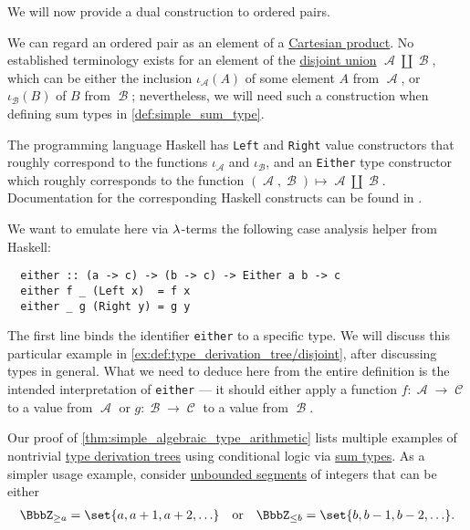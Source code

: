 \begin{example}
\begin{thmenum}
     We will now provide a dual construction to ordered pairs.

    We can regard an ordered pair as an element of a \hyperref[def:cartesian_product]{Cartesian product}. No established terminology exists for an element of the \hyperref[def:disjoint_union]{disjoint union} \( \mscrA \amalg \mscrB \), which can be either the inclusion \( \iota_\mscrA(A) \) of some element \( A \) from \( \mscrA \), or \( \iota_\mscrB(B) \) of \( B \) from \( \mscrB \); nevertheless, we will need such a construction when defining sum types in \cref{def:simple_sum_type}.

    The programming language Haskell has \verb|Left| and \verb|Right| value constructors that roughly correspond to the functions \( \iota_\mscrA \) and \( \iota_\mscrB \), and an \verb|Either| type constructor which roughly corresponds to the function \( (\mscrA, \mscrB) \mapsto \mscrA \amalg \mscrB \). Documentation for the corresponding Haskell constructs can be found in \cite{HackageDocs:base-4.21:either}.

    We want to emulate here via \( {\mathrm \lambda} \)-terms the following case analysis helper from Haskell:
    \begin{verbatim}
  either :: (a -> c) -> (b -> c) -> Either a b -> c
  either f _ (Left x)  = f x
  either _ g (Right y) = g y
    \end{verbatim}\vspace{-\baselineskip}

    The first line binds the identifier \verb|either| to a specific type. We will discuss this particular example in \cref{ex:def:type_derivation_tree/disjoint}, after discussing types in general. What we need to deduce here from the entire definition is the intended interpretation of \verb|either| --- it should either apply a function \( f: \mscrA \to \mscrC \) to a value from \( \mscrA \) or \( g: \mscrB \to \mscrC \) to a value from \( \mscrB \).

    Our proof of \cref{thm:simple_algebraic_type_arithmetic} lists multiple examples of nontrivial \hyperref[def:type_derivation_tree]{type derivation trees} using conditional logic via \hyperref[def:simple_sum_type]{sum types}. As a simpler usage example, consider \hyperref[def:order_interval/unbounded]{unbounded segments} of integers that can be either
    \begin{align*}
      \BbbZ_{\geq a} = \set{ a, a + 1, a + 2, \ldots }
      &&\T{or}&&
      \BbbZ_{\leq b} = \set{ b, b - 1, b - 2, \ldots }.
    \end{align*}


\end{thmenum}
\end{example}

